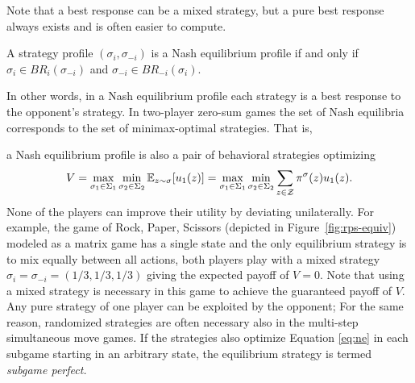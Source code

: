 {Note that a best response can be a mixed strategy, but a pure best response always exists and is often easier to compute.

\begin{definition}
A strategy profile $(\sigma_i, \sigma_{-i})$ is a Nash equilibrium profile if and only if $\sigma_i \in BR_i(\sigma_{-i})$
and $\sigma_{-i} \in BR_{-i}(\sigma_i)$.
\end{definition}

In other words, in a Nash equilibrium profile each strategy is a best response to the opponent's strategy. In two-player zero-sum
games the set of Nash equilibria corresponds to the set of minimax-optimal strategies. That is,} a Nash equilibrium profile is
also a pair of behavioral strategies optimizing
\begin{equation}\label{eq:ne}
V = \max_{\sigma_1 \in \Sigma_1} \min_{\sigma_2 \in \Sigma_2} \mathbb{E}_{z \sim \sigma}[u_1(z)]
  = \max_{\sigma_1 \in \Sigma_1} \min_{\sigma_2 \in \Sigma_2} \sum_{z \in \mathcal{Z}} \pi^\sigma(z) u_1(z).
\end{equation}
None of the players can improve their utility by deviating unilaterally.
For example, the game of Rock, Paper, Scissors (depicted in Figure~\ref{fig:rps-equiv}) modeled as a matrix game has a single state and the only equilibrium strategy is to mix equally between
all actions, \ie both players play with a mixed strategy $\sigma_i = \sigma_{-i} = (1/3, 1/3, 1/3)$ giving the expected payoff of
$V = 0$.
Note that using a mixed strategy is necessary in this game to achieve the guaranteed payoff of $V$.
Any pure strategy of one player can be exploited by the opponent; 
For the same reason, randomized strategies are often necessary also in the multi-step simultaneous move games.
If the strategies also optimize Equation \ref{eq:ne} in each subgame starting in an arbitrary state, the equilibrium strategy
is termed {\it subgame perfect.}

